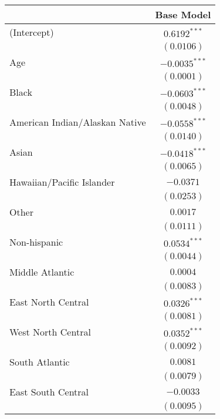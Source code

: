 \documentclass{article}
\begin{document}
\begin{table}
\begin{center}
\begin{tabular}{l c}
\hline
 & Base Model \\
\hline
(Intercept)                    & $0.6192^{***}$  \\
                               & $(0.0106)$      \\
Age                            & $-0.0035^{***}$ \\
                               & $(0.0001)$      \\
Black                          & $-0.0603^{***}$ \\
                               & $(0.0048)$      \\
American Indian/Alaskan Native & $-0.0558^{***}$ \\
                               & $(0.0140)$      \\
Asian                          & $-0.0418^{***}$ \\
                               & $(0.0065)$      \\
Hawaiian/Pacific Islander      & $-0.0371$       \\
                               & $(0.0253)$      \\
Other                          & $0.0017$        \\
                               & $(0.0111)$      \\
Non-hispanic                   & $0.0534^{***}$  \\
                               & $(0.0044)$      \\
Middle Atlantic                & $0.0004$        \\
                               & $(0.0083)$      \\
East North Central             & $0.0326^{***}$  \\
                               & $(0.0081)$      \\
West North Central             & $0.0352^{***}$  \\
                               & $(0.0092)$      \\
South Atlantic                 & $0.0081$        \\
                               & $(0.0079)$      \\
East South Central             & $-0.0033$       \\
                               & $(0.0095)$      \\

\end{tabular}
\end{center}
\end{table}
\end{document}
